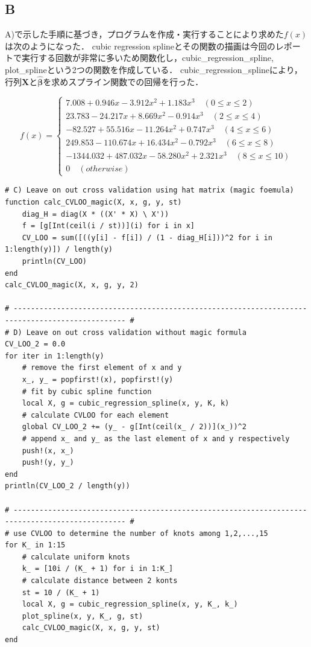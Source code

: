 \documentclass[dvipdfmx]{ujarticle}
\begin{document}
\subsection*{B}
A)で示した手順に基づき，プログラムを作成・実行することにより求めた$f(x)$は次のようになった．
cubic regression splineとその関数の描画は今回のレポートで実行する回数が非常に多いため関数化し，cubic\_regression\_spline, plot\_splineという2つの関数を作成している．
cubic\_regression\_splineにより，行列$\mathbf{X}$と$\hat{\boldsymbol{\beta}}$を求めスプライン関数での回帰を行った．

\begin{equation}
f(x)=\left\{\begin{array}{l}
7.008+0.946 x-3.912 x^{2}+1.183 x^{3} \quad (0\le x \le 2) \\
23.783-24.217 x+8.669 x^{2}-0.914 x^{3} \quad (2\le x \le 4) \\
-82.527+55.516 x-11.264 x^{2}+0.747 x^{3} \quad (4\le x \le 6) \\
249.853-110.674 x+16.434 x^{2}-0.792 x^{3} \quad (6\le x \le 8) \\
-1344.032+487.032 x-58.280 x^{2}+2.321 x^{3} \quad (8\le x \le 10) \\
0 \quad (otherwise)
\end{array}\right.
\end{equation}

\small{
\begin{screen}
\begin{verbatim}
# C) Leave on out cross validation using hat matrix (magic foemula)
function calc_CVLOO_magic(X, x, g, y, st)
    diag_H = diag(X * ((X' * X) \ X'))
    f = [g[Int(ceil(i / st))](i) for i in x]
    CV_LOO = sum([((y[i] - f[i]) / (1 - diag_H[i]))^2 for i in 1:length(y)]) / length(y)
    println(CV_LOO)
end
calc_CVLOO_magic(X, x, g, y, 2)

# ------------------------------------------------------------------------------------------------ #
# D) Leave on out cross validation without magic formula
CV_LOO_2 = 0.0
for iter in 1:length(y)
    # remove the first element of x and y
    x_, y_ = popfirst!(x), popfirst!(y)
    # fit by cubic spline function
    local X, g = cubic_regression_spline(x, y, K, k)
    # calculate CVLOO for each element
    global CV_LOO_2 += (y_ - g[Int(ceil(x_ / 2))](x_))^2
    # append x_ and y_ as the last element of x and y respectively
    push!(x, x_)
    push!(y, y_)
end
println(CV_LOO_2 / length(y))

# ------------------------------------------------------------------------------------------------ #
# use CVLOO to determine the number of knots among 1,2,...,15
for K_ in 1:15
    # calculate uniform knots
    k_ = [10i / (K_ + 1) for i in 1:K_]
    # calculate distance between 2 konts
    st = 10 / (K_ + 1)
    local X, g = cubic_regression_spline(x, y, K_, k_)
    plot_spline(x, y, K_, g, st)
    calc_CVLOO_magic(X, x, g, y, st)
end
\end{verbatim}
\end{screen}}
\end{document}

